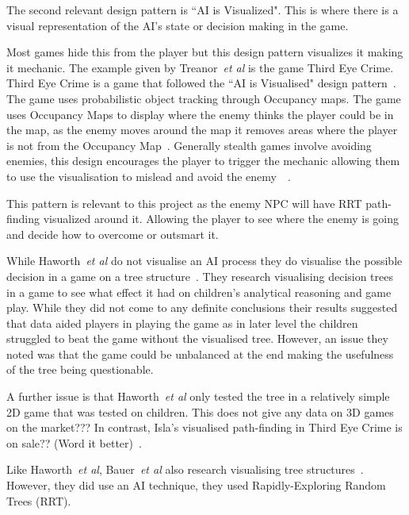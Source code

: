 \documentclass[journal]{IEEEtran}
\begin{document}
The second relevant design pattern is ``AI is Visualized". This is where there is a visual representation of the AI's state or decision making in the game. 

Most games hide this from the player but this design pattern visualizes it making it mechanic.  
The example given by Treanor~\textit{et al} is the game Third Eye Crime.  Third Eye Crime is a game that followed the ``AI is Visualised" design pattern~\cite{Isla2014, game:ThirdEyeCrime}.  
The game uses probabilistic object tracking through Occupancy maps. The game uses Occupancy Maps to display where the enemy thinks the player could be in the map, as the enemy moves around the map it removes areas where the player is not from the Occupancy Map~\cite{Isla2014}.  Generally stealth games involve avoiding enemies,  this design encourages the player to trigger the mechanic allowing them to use the visualisation to mislead and avoid the enemy~\cite{Isla2014}~\cite{game:ThirdEyeCrime}.  

This pattern is relevant to this project as the enemy NPC will have RRT path-finding visualized around it. Allowing the player to see where the enemy is going and decide how to overcome or outsmart it.

While Haworth~\textit{et al} do not visualise an AI process they do visualise the possible decision in a game on a tree structure~\cite{Haworth2010}. They research visualising decision trees in a game to see what effect it had on children's analytical reasoning and game play.  While they did not come to any definite conclusions their results suggested that data aided players in playing the game as in later level the children struggled to beat the game without the visualised tree. However, an issue they noted was that the game could be unbalanced at the end making the usefulness of the tree being questionable.  

A further issue is that Haworth~\textit{et al} only tested the tree in a relatively simple 2D game that was tested on children. This does not give any data on 3D games on the market??? In contrast, Isla's visualised path-finding in Third Eye Crime is on sale?? (Word it better)~\cite{Isla2014}.
 
Like  Haworth~\textit{et al}, Bauer~\textit{et al} also research visualising tree structures~\cite{bauer2012}. However, they did use an AI technique, they used Rapidly-Exploring Random Trees (RRT).
\end{document}
